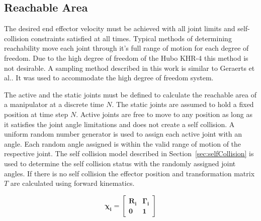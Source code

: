 \subsection{Reachable Area}\label{sec:rarea}
The desired end effector velocity must be achieved with all joint limits and self-collision constraints satisfied at all times. Typical methods of determining reachability move each joint through it's full range of motion for each degree of freedom\cite{100034,springerlink:101007}. Due to the high degree of freedom of the Hubo KHR-4 this method is not desirable.  A sampling method described in this work is similar to Geraerts et al.\cite{1570152}.  It was used to accommodate the high degree of freedom system.

The active and the static joints must be defined to calculate the reachable area of a manipulator at a discrete time $N$.  The static joints are assumed to hold a fixed position at time step $N$.  Active joints are free to move to any position as long as it satisfies the joint angle limitations and does not create a self collision.  A uniform random number generator is used to assign each active joint with an angle.  Each random angle assigned is within the valid range of motion of the respective joint.  The self collision model described in Section~\ref{sec:selfCollision} is used to determine the self collision status with the randomly assigned joint angles.  If there is no self collision the effector position and transformation matrix $T$ are calculated using forward kinematics.

\begin{equation}\label{eq:fk1}
\mathbf{
\chi_i = \begin{bmatrix} R_{i} & \Gamma_{i} \\ 0 & 1 \end{bmatrix}
}
\end{equation}

